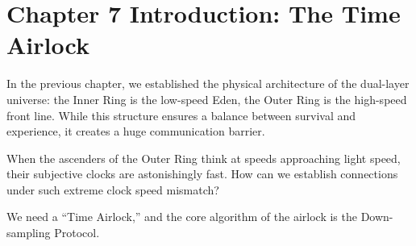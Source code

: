 \section*{Chapter 7 Introduction: The Time Airlock}

In the previous chapter, we established the physical architecture of the dual-layer universe: the Inner Ring is the low-speed Eden, the Outer Ring is the high-speed front line. While this structure ensures a balance between survival and experience, it creates a huge communication barrier.

When the ascenders of the Outer Ring think at speeds approaching light speed, their subjective clocks are astonishingly fast. How can we establish connections under such extreme clock speed mismatch?

We need a ``Time Airlock,'' and the core algorithm of the airlock is the Down-sampling Protocol.

